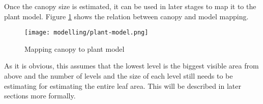 Once the canopy size is estimated, it can be used in later stages to map it to the plant model.
Figure \ref{fig:canopy} shows the relation between canopy and model mapping.

\begin{figure}[H]
    \texttt{[image: modelling/plant-model.png]}
    \caption{Mapping canopy to plant model}
    \label{fig:canopy}
\end{figure}

As it is obvious, this assumes that the lowest level is the biggest visible area from above
and the number of levels and the size of each level still needs to be estimating for estimating the
entire leaf area.
This will be described in later sections more formally.
